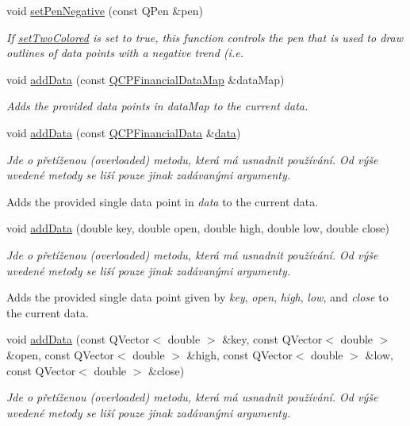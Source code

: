 \begin{DoxyCompactItemize}
void \hyperlink{classQCPFinancial_afe5c07e94ccea01a75b3a2476993c346}{set\+Pen\+Negative} (const Q\+Pen \&pen)
\begin{DoxyCompactList}\small\item\em If \hyperlink{classQCPFinancial_a138e44aac160a17a9676652e240c5f08}{set\+Two\+Colored} is set to true, this function controls the pen that is used to draw outlines of data points with a negative trend (i.\+e. \end{DoxyCompactList}\item 
void \hyperlink{classQCPFinancial_a1a83396f97fcc68f2b7aa8d9782feffe}{add\+Data} (const \hyperlink{qcustomplot_8h_a745c09823fae0974b50beca9bc3b3d7d}{Q\+C\+P\+Financial\+Data\+Map} \&data\+Map)
\begin{DoxyCompactList}\small\item\em Adds the provided data points in {\itshape data\+Map} to the current data. \end{DoxyCompactList}\item 
void \hyperlink{classQCPFinancial_a3b6144b48a6a8e63236fc5bf70d40c00}{add\+Data} (const \hyperlink{classQCPFinancialData}{Q\+C\+P\+Financial\+Data} \&\hyperlink{classQCPFinancial_a58e05aefa057d16edfcc0334cf81c241}{data})
\begin{DoxyCompactList}\small\item\em Jde o přetíženou (overloaded) metodu, která má usnadnit používání. Od výše uvedené metody se liší pouze jinak zadávanými argumenty.

Adds the provided single data point in {\itshape data} to the current data. \end{DoxyCompactList}\item 
void \hyperlink{classQCPFinancial_a688bbd052e00a02954ddb0068b378170}{add\+Data} (double key, double open, double high, double low, double close)
\begin{DoxyCompactList}\small\item\em Jde o přetíženou (overloaded) metodu, která má usnadnit používání. Od výše uvedené metody se liší pouze jinak zadávanými argumenty.

Adds the provided single data point given by {\itshape key}, {\itshape open}, {\itshape high}, {\itshape low}, and {\itshape close} to the current data. \end{DoxyCompactList}\item 
void \hyperlink{classQCPFinancial_aa1abe3bdafb297497f09cdbdc4db3958}{add\+Data} (const Q\+Vector$<$ double $>$ \&key, const Q\+Vector$<$ double $>$ \&open, const Q\+Vector$<$ double $>$ \&high, const Q\+Vector$<$ double $>$ \&low, const Q\+Vector$<$ double $>$ \&close)
\begin{DoxyCompactList}\small\item\em Jde o přetíženou (overloaded) metodu, která má usnadnit používání. Od výše uvedené metody se liší pouze jinak zadávanými argumenty.


\end{DoxyCompactList}
\end{DoxyCompactItemize}
